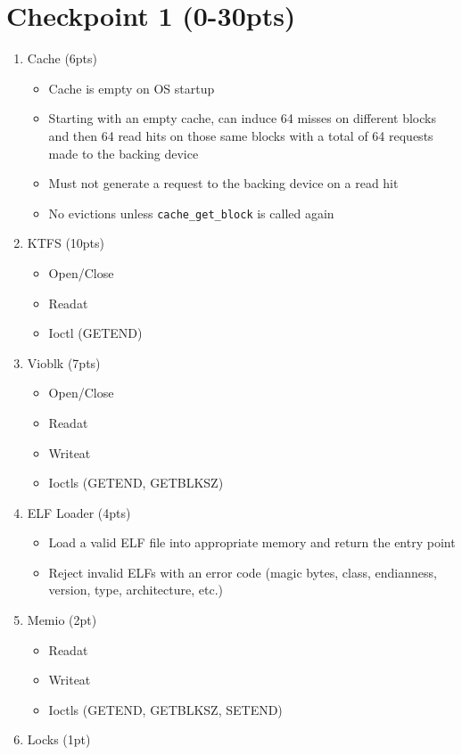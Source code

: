 \documentclass{article}
\begin{document}
\section*{Checkpoint 1 (0-30pts)}

\begin{enumerate}
    \item Cache (6pts)
    \begin{itemize}
        \item Cache is empty on OS startup
        \item Starting with an empty cache, can induce 64 misses on different blocks and then 64 read hits on those same blocks with a total of 64 requests made to the backing device
        \item Must not generate a request to the backing device on a read hit
        \item No evictions unless \texttt{cache\_get\_block} is called again
    \end{itemize}
    \item KTFS (10pts)
    \begin{itemize}
        \item Open/Close
        \item Readat
        \item Ioctl (GETEND)
    \end{itemize}
    \item Vioblk (7pts)
    \begin{itemize}
        \item Open/Close
        \item Readat
        \item Writeat
        \item Ioctls (GETEND, GETBLKSZ)
    \end{itemize}
    \item ELF Loader (4pts)
    \begin{itemize}
        \item Load a valid ELF file into appropriate memory and return the entry point
        \item Reject invalid ELFs with an error code (magic bytes, class, endianness, version, type, architecture, etc.)
    \end{itemize}
    \item Memio (2pt)
    \begin{itemize}
        \item Readat
        \item Writeat
        \item Ioctls (GETEND, GETBLKSZ, SETEND)
    \end{itemize}
    \item Locks (1pt)
\end{enumerate}
\end{document}
